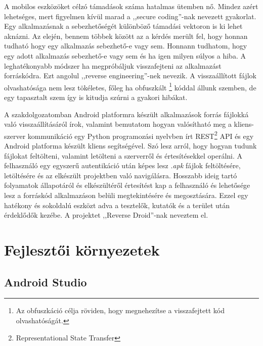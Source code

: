\documentclass{thesis-ekf}
\theoremstyle{definition}
\theoremstyle{remark}
\begin{document}
A mobilos eszközöket célzó támadások száma hatalmas ütemben nő. Mindez azért lehetséges, mert figyelmen kívül marad a ,,secure coding''-nak nevezett gyakorlat.
Egy alkalmazásnak a sebezhetőségét különböző támadási vektoron is ki lehet aknázni.
Az elején, bennem többek között az a kérdés merült fel, hogy honnan tudható hogy egy alkalmazás sebezhető-e vagy sem.
Honnann tudhatom, hogy egy adott alkalmazás sebezhető-e vagy sem és ha igen milyen súlyos a hiba.
A leghatékonyabb módszer ha megpróbáljuk visszafejteni az alkalmazást forráskódra.
Ezt angolul ,,reverse engineering''-nek nevezik.
A visszaállított fájlok olvashatósága nem lesz tökéletes, főleg ha obfuszkált \footnote{Az obfuszkáció célja röviden, hogy megnehezítse a visszafejtett kód olvashatóságát.} kóddal állunk szemben, de egy tapasztalt szem így is kitudja szúrni a gyakori hibákat.

A szakdolgozatomban Android platformra készült alkalmazások forrás fájlokká való visszaállításáról írok, valamint bemutatom hogyan valósítható meg a kliens-szerver kommunikáció egy Python programozási nyelvben írt REST\footnote{Representational State Transfer} API és egy Android platforma készült kliens segítségével.
Szó lesz arról, hogy hogyan tudunk fájlokat feltölteni, valamint letölteni a szerverről és értesítésekkel operálni.
A felhasználó egy egyszerű autentikáció után képes lesz \emph{.apk} fájlok feltöltésére, letöltésére és az elkészült projektben való navigálásra.
Hosszabb ideig tartó folyamatok állapotáról és elkészültéről értesítést kap a felhasználó és lehetősége lesz a forráskód alkalmazáson belüli megtekintésére és megosztására.
Ezzel egy hatékony és sokoldalú eszközt adva a tesztelők, kutatók és a terület után érdeklődők kezébe.
A projektet ,,Reverse Droid''-nak neveztem el.

\chapter{Fejlesztői környezetek}\label{kornyezetek}

\section{Android Studio}
\end{document}
